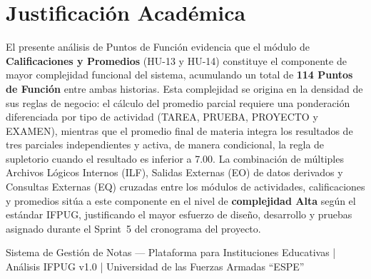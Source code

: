 \documentclass[12pt, a4paper]{article}
\begin{document}
\section{Justificación Académica}

El presente análisis de Puntos de Función evidencia que el módulo de
\textbf{Calificaciones y Promedios} (HU-13 y HU-14) constituye el componente
de mayor complejidad funcional del sistema, acumulando un total de
\textbf{114 Puntos de Función} entre ambas historias. Esta complejidad se
origina en la densidad de sus reglas de negocio: el cálculo del promedio
parcial requiere una ponderación diferenciada por tipo de actividad
(TAREA, PRUEBA, PROYECTO y EXAMEN), mientras que el promedio final de materia
integra los resultados de tres parciales independientes y activa, de manera
condicional, la regla de supletorio cuando el resultado es inferior a 7.00.
La combinación de múltiples Archivos Lógicos Internos (ILF), Salidas
Externas (EO) de datos derivados y Consultas Externas (EQ) cruzadas entre los
módulos de actividades, calificaciones y promedios sitúa a este componente en
el nivel de \textbf{complejidad Alta} según el estándar IFPUG, justificando
el mayor esfuerzo de diseño, desarrollo y pruebas asignado durante el Sprint~5
del cronograma del proyecto.

\vfill
\begin{center}
  \small\color{grisoscuro}
  Sistema de Gestión de Notas --- Plataforma para Instituciones Educativas \quad|\quad
  Análisis IFPUG v1.0 \quad|\quad
  Universidad de las Fuerzas Armadas ``ESPE''
\end{center}
\end{document}
